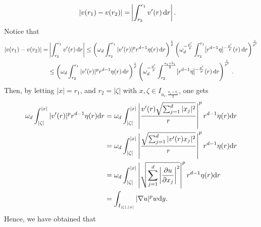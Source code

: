 \documentclass[11pt,leqno]{amsart}
\theoremstyle{remark}
\theoremstyle{definition}
\theoremstyle{definition}
\def\de{{\rm d}}
\begin{document}
\begin{equation*}
\begin{split}
|v(r_{1})-v(r_{2})|=&\left|\int_{r_{2}}^{r_{1}}v'(r)\,\de r\right|.
\end{split}
\end{equation*}
Notice that
\begin{equation*}
\begin{split}
|v(r_{1})-v(r_{2})|=&\left|\int_{r_{2}}^{r_{1}}v'(r)\,\de r\right|\leq
\left(\omega_{d}\int_{r_{2}}^{r_{1}}|v'(r)|^{p}r^{d-1}\eta(r)\,\de r\right)^{1\over p}
\left(\omega_{d}^{-\frac{p'}{p}}\int_{r_{2}}^{r_{1}} [r^{d-1}\eta]^{-\frac{p'}{p}}(r)\,\de r\right)^{1\over p'}\\
&  
\leq \left(\omega_{d}\int_{r_{2}}^{r_{1}}|v'(r)|^{p}r^{d-1}\eta(r)\,\de r\right)^{1\over p}
\left(\omega_{d}^{-\frac{p'}{p}}\int_{r_{2}}^{{{a_i+b_i}\over{2}}}[r^{d-1}\eta]^{-\frac{p'}{p}}(r)\,\de r\right)^{1\over p'}\,.
\end{split}
\end{equation*}
Then, by letting $\vert x\vert=r_{1}$, and $r_{2}=\vert \zeta\vert$ with $x,\zeta\in I_{a_{i},\frac{a_{i}+b_{i}}{2}}$, one gets
\begin{align*}
 \omega_{d}\displaystyle\int_{\vert\zeta\vert}^{\vert x\vert} \vert v'(r)\vert^{p}r^{d-1}\eta(r) \de r
&=\omega_{d}\displaystyle\int_{\vert\zeta\vert}^{\vert x\vert}\left\vert \frac{ v'(r)\sqrt{\sum_{j=1}^{d}\vert x_{j}\vert^{2}}}{r}\right\vert^{p}r^{d-1}\eta(r)\de r\\
&=\omega_{d}\displaystyle\int_{\vert\zeta\vert}^{\vert x\vert}\left\vert \frac{\sqrt{\sum_{j=1}^{d}\vert v'(r)x_{j}\vert^{2}}}{r}\right\vert^{p}r^{d-1}\eta(r)\de r\\
&=\omega_{d}\displaystyle\int_{\vert\zeta\vert}^{\vert x\vert}\left\vert \sqrt{\sum_{j=1}^{d}\left\vert \frac{\partial u}{\partial x_{j}}\right\vert^{2}}\right\vert^{p}r^{d-1}\eta(r)\de r\\
&=\displaystyle\int_{I_{\vert \zeta\vert,\vert x\vert}}\vert \nabla u\vert^{p}w\de y.
\end{align*}
Hence, we have obtained that
\end{document}
